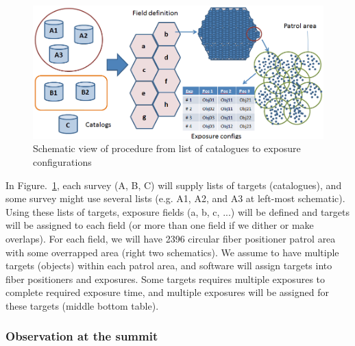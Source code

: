 \documentclass[a4paper,notitlepage]{article}
\begin{document}
\begin{figure}[htb]
  \begin{center}
    \includegraphics[width=.75\linewidth]{sciops-scireq-slide-svyexp.png}
  \end{center}
  \caption{Schematic view of procedure from list of catalogues to exposure 
    configurations}
  \label{fig:sciops-scireq-slide-svyexp}
\end{figure}

In Figure.~\ref{fig:sciops-scireq-slide-svyexp}, 
each survey (A, B, C) will supply lists of targets (catalogues), 
and some survey might use several lists (e.g. A1, A2, and A3 at left-most 
schematic). 
Using these lists of targets, exposure fields (a, b, c, ...) will be defined 
and targets will be assigned to each field (or more than one field if we 
dither or make overlaps). 
For each field, we will have 2396 circular fiber positioner patrol area 
with some overrapped area (right two schematics). 
We assume to have multiple targets (objects) within each patrol area, 
and software will assign targets into fiber positioners and exposures. 
Some targets requires multiple exposures to complete required exposure time, 
and multiple exposures will be assigned for these targets
(middle bottom table). 


\subsubsection{Observation at the summit}
\end{document}
